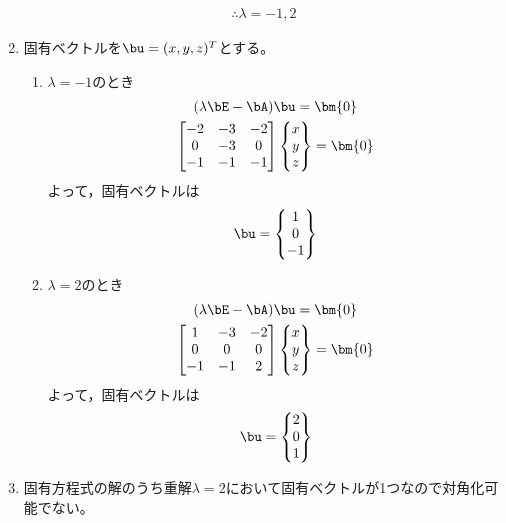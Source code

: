 \begin{ans*}
\begin{enumerate}[label=(\arabic*)]
    \begin{gather}
      \therefore \lambda = -1, 2 
    \end{gather}
    \item 固有ベクトルを$\bu = (x,y,z)^T$とする。
    \begin{enumerate}[label=(\roman*)]
      \item $\lambda = -1$のとき
      \begin{gather}
        (\lambda\bE - \bA)\bu = \bm{0} \\
        \begin{bmatrix}
          -2& -3& -2 \\
          0& -3& 0 \\
          -1& -1& -1 \\
        \end{bmatrix}
        \begin{Bmatrix}
          x \\ y \\ z
        \end{Bmatrix}
        =\bm{0} \\
      \end{gather}
      よって，固有ベクトルは
      \begin{gather}
        \bu =
        \begin{Bmatrix}
          1 \\ 0 \\ -1
        \end{Bmatrix}
      \end{gather}
      \item $\lambda = 2$のとき
      \begin{gather}
        (\lambda\bE - \bA)\bu = \bm{0} \\
        \begin{bmatrix}
          1& -3& -2 \\
          0& 0& 0 \\
          -1& -1& 2
        \end{bmatrix}
        \begin{Bmatrix}
          x \\ y \\ z
        \end{Bmatrix}
        =\bm{0} \\
      \end{gather}
      よって，固有ベクトルは
      \begin{gather}
        \bu =
        \begin{Bmatrix}
          2 \\ 0 \\ 1
        \end{Bmatrix}
      \end{gather}
    \end{enumerate}
    \item 固有方程式の解のうち重解$\lambda = 2$において固有ベクトルが1つなので対角化可能でない。
  \end{enumerate}


\end{ans*}
